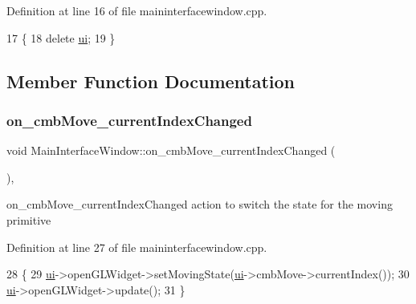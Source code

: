 Definition at line 16 of file maininterfacewindow.\+cpp.


\begin{DoxyCode}
17 \{
18     \textcolor{keyword}{delete} \hyperlink{class_main_interface_window_afe3aae95d697ade063b0e4ad517655b9}{ui};
19 \}
\end{DoxyCode}


\subsection{Member Function Documentation}
\mbox{\label{class_main_interface_window_a88d3fa446248d7d4c054cdf9e228571c}} 
\subsubsection{\texorpdfstring{on\+\_\+cmb\+Move\+\_\+current\+Index\+Changed}{on\_cmbMove\_currentIndexChanged}}
{\footnotesize\ttfamily void Main\+Interface\+Window\+::on\+\_\+cmb\+Move\+\_\+current\+Index\+Changed (\begin{DoxyParamCaption}{ }\end{DoxyParamCaption})\hspace{0.3cm}{\ttfamily [private]}, {\ttfamily [slot]}}



on\+\_\+cmb\+Move\+\_\+current\+Index\+Changed action to switch the state for the moving primitive 



Definition at line 27 of file maininterfacewindow.\+cpp.


\begin{DoxyCode}
28 \{
29     \hyperlink{class_main_interface_window_afe3aae95d697ade063b0e4ad517655b9}{ui}->openGLWidget->setMovingState(\hyperlink{class_main_interface_window_afe3aae95d697ade063b0e4ad517655b9}{ui}->cmbMove->currentIndex());
30     \hyperlink{class_main_interface_window_afe3aae95d697ade063b0e4ad517655b9}{ui}->openGLWidget->update();
31 \}
\end{DoxyCode}
\mbox{\label{class_main_interface_window_a380d5adfd4f2f434a4dbceba61a3223f}} 
